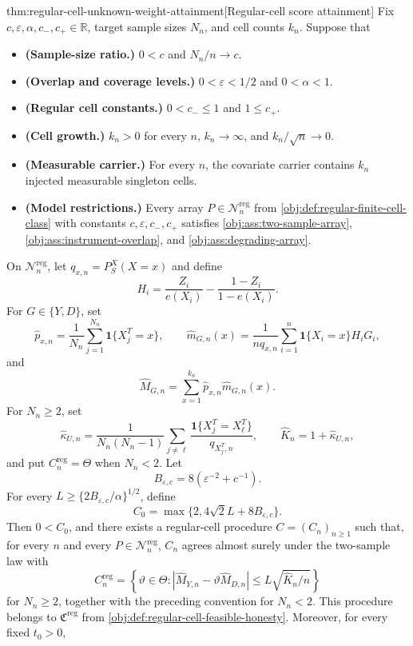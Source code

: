 \documentclass[11pt]{article}
\begin{document}
\begin{theoremv}{thm:regular-cell-unknown-weight-attainment}[Regular-cell score attainment]
Fix \(c,\varepsilon,\alpha,c_-,c_+\in\mathbb R\), target sample sizes \(N_n\), and cell counts \(k_n\).  Suppose that
\begin{itemize}
\item \textbf{(Sample-size ratio.)} \(0<c\) and \(N_n/n\to c\).
\item \textbf{(Overlap and coverage levels.)} \(0<\varepsilon<1/2\) and \(0<\alpha<1\).
\item \textbf{(Regular cell constants.)} \(0<c_-\le 1\) and \(1\le c_+\).
\item \textbf{(Cell growth.)} \(k_n>0\) for every \(n\), \(k_n\to\infty\), and \(k_n/\sqrt n\to0\).
\item \textbf{(Measurable carrier.)} For every \(n\), the covariate carrier contains \(k_n\) injected measurable singleton cells.
\item \textbf{(Model restrictions.)} Every array \(P\in\mathcal N_n^{\mathrm{reg}}\) from \cref{obj:def:regular-finite-cell-class} with constants \(c,\varepsilon,c_-,c_+\) satisfies \cref{obj:ass:two-sample-array}, \cref{obj:ass:instrument-overlap}, and \cref{obj:ass:degrading-array}.
\end{itemize}
On \(\mathcal N_n^{\mathrm{reg}}\), let \(q_{x,n}=P_S^X(X=x)\) and define
\[
H_i=\frac{Z_i}{e(X_i)}-\frac{1-Z_i}{1-e(X_i)}.
\]
For \(G\in\{Y,D\}\), set
\[
\widehat p_{x,n}=\frac1{N_n}\sum_{j=1}^{N_n}\mathbf 1\{X_j^T=x\},
\qquad
\widehat m_{G,n}(x)=\frac1{nq_{x,n}}\sum_{i=1}^n
\mathbf 1\{X_i=x\}H_iG_i,
\]
and
\[
\widehat M_{G,n}=\sum_{x=1}^{k_n}\widehat p_{x,n}\widehat m_{G,n}(x).
\]
For \(N_n\ge2\), set
\[
\widehat\kappa_{U,n}
=
\frac1{N_n(N_n-1)}\sum_{j\ne\ell}
\frac{\mathbf 1\{X_j^T=X_\ell^T\}}{q_{X_j^T,n}},
\qquad
\widehat K_n=1+\widehat\kappa_{U,n},
\]
and put \(C_n^{\mathrm{reg}}=\Theta\) when \(N_n<2\).  Let
\[
B_{\varepsilon,c}=8(\varepsilon^{-2}+c^{-1}).
\]
For every \(L\ge\{2B_{\varepsilon,c}/\alpha\}^{1/2}\), define
\[
C_{0}=\max\{2,4\sqrt2L+8B_{\varepsilon,c}\}.
\]
Then \(0<C_0\), and there exists a regular-cell procedure \(C=(C_n)_{n\ge1}\) such that, for every \(n\) and every \(P\in\mathcal N_n^{\mathrm{reg}}\), \(C_n\) agrees almost surely under the two-sample law with
\[
C_n^{\mathrm{reg}}
=
\left\{\vartheta\in\Theta:
|\widehat M_{Y,n}-\vartheta\widehat M_{D,n}|
\le L\sqrt{\widehat K_n/n}\right\}
\]
for \(N_n\ge2\), together with the preceding convention for \(N_n<2\).  This procedure belongs to \(\mathfrak C^{\mathrm{reg}}\) from \cref{obj:def:regular-cell-feasible-honesty}.  Moreover, for every fixed \(t_0>0\),

\end{theoremv}
\end{document}
